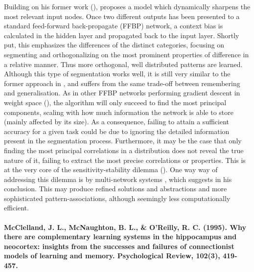 Building on his former work (\cite{French1992}), \cite{French1994} proposes a model which dynamically sharpens the most relevant input nodes. Once two different outputs has been presented to a standard feed-forward back-propagate (FFBP) network, a context bias is calculated in the hidden layer and propagated back to the input layer. Shortly put, this emphasizes the differences of the distinct categories, focusing on segmenting and orthogonalizing on the most prominent properties of difference in a relative manner. Thus more orthogonal, well distributed patterns are learned.
Although this type of segmentation works well, it is still very similar to the former approach in \cite{French1992}, and suffers from the same trade-off between remembering and generalisation. As in other FFBP networks performing gradient descent in weight space (\cite{Hinton1989}), the algorithm will only succeed to find the most principal components, scaling with how much information the network is able to store (mainly affected by its size). As a consequence, failing to attain a sufficient accuracy for a given task could be due to ignoring the detailed information present in the segmentation process. Furthermore, it may be the case that only finding the most principal correlations in a distribution does not reveal the true nature of it, failing to extract the most precise correlations or properties. This is at the very core of the sensitivity-stability dilemma (\cite{Hebb1949}). One way way of addressing this dilemma is by multi-network systems , which \cite{French1994} suggests in his conclusion. This may produce refined solutions and abstractions and more sophisticated pattern-associations, although seemingly less computationally efficient.
\\
\\
\textbf{McClelland, J. L., McNaughton, B. L., \& O’Reilly, R. C. (1995). Why there are complementary learning systems in the hippocampus and neocortex: insights from the successes and failures of connectionist models of learning and memory. Psychological Review, 102(3), 419-457.}

